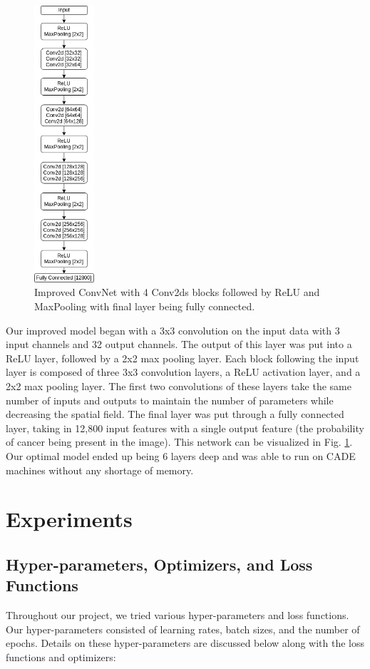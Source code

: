 \documentclass[11pt]{ieeeconf}
\begin{document}
\begin{figure}[h]
  \centering
  \includegraphics[width=6em]{improved_net.png}
  \caption{Improved ConvNet with 4 Conv2ds blocks followed by ReLU and MaxPooling with final layer being fully connected.}
  \label{fig:improved_conv}
\end{figure}

Our improved model began with a 3x3 convolution on the input data with 3 input channels and 32 output channels. The output of this layer was put into a ReLU layer, followed by a 2x2 max pooling layer. Each block following the input layer is composed of three 3x3 convolution layers, a ReLU activation layer, and a 2x2 max pooling layer. The first two convolutions of these layers take the same number of inputs and outputs to maintain the number of parameters while decreasing the spatial field. The final layer was put through a fully connected layer, taking in 12,800 input features with a single output feature (the probability of cancer being present in the image). This network can be visualized in Fig. \ref{fig:improved_conv}. Our optimal model ended up being 6 layers deep and was able to run on CADE machines without any shortage of memory.


\section{Experiments}
\subsection{Hyper-parameters, Optimizers, and Loss Functions}
Throughout our project, we tried various hyper-parameters and loss functions. Our hyper-parameters consisted of learning rates, batch sizes, and the number of epochs. Details on these hyper-parameters are discussed below along with the loss functions and optimizers:
\end{document}

